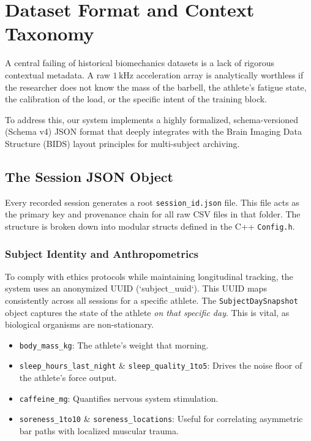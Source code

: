 \section{Dataset Format and Context Taxonomy}

A central failing of historical biomechanics datasets is a lack of rigorous contextual metadata. A raw $1\,\text{kHz}$ acceleration array is analytically worthless if the researcher does not know the mass of the barbell, the athlete's fatigue state, the calibration of the load, or the specific intent of the training block. 

To address this, our system implements a highly formalized, schema-versioned (Schema v4) JSON format that deeply integrates with the Brain Imaging Data Structure (BIDS) layout principles for multi-subject archiving.

\subsection{The Session JSON Object}
Every recorded session generates a root \texttt{session\_id.json} file. This file acts as the primary key and provenance chain for all raw CSV files in that folder. The structure is broken down into modular structs defined in the C++ \texttt{Config.h}.

\subsubsection{Subject Identity and Anthropometrics}
To comply with ethics protocols while maintaining longitudinal tracking, the system uses an anonymized UUID (`subject_uuid`). This UUID maps consistently across all sessions for a specific athlete. 
The \texttt{SubjectDaySnapshot} object captures the state of the athlete \textit{on that specific day}. This is vital, as biological organisms are non-stationary.
\begin{itemize}
    \item \texttt{body\_mass\_kg}: The athlete's weight that morning.
    \item \texttt{sleep\_hours\_last\_night} \& \texttt{sleep\_quality\_1to5}: Drives the noise floor of the athlete's force output.
    \item \texttt{caffeine\_mg}: Quantifies nervous system stimulation.
    \item \texttt{soreness\_1to10} \& \texttt{soreness\_locations}: Useful for correlating asymmetric bar paths with localized muscular trauma.
\end{itemize}


